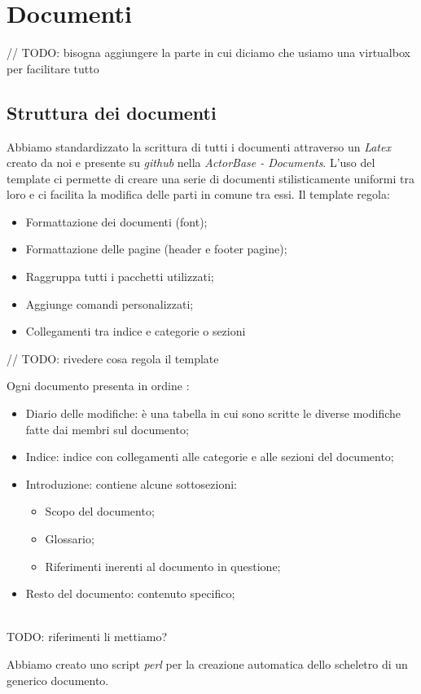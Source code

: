 \section{Documenti}
	// TODO: bisogna aggiungere la parte in cui diciamo che usiamo una virtualbox per facilitare tutto

\subsection{Struttura dei documenti}
Abbiamo standardizzato la scrittura di tutti i documenti attraverso un  \textit{Latex} creato da noi e presente su \textit{github} nella  \textit{ActorBase - Documents}.
L'uso del template ci permette di creare una serie di documenti stilisticamente uniformi tra loro e ci facilita la modifica delle parti in comune tra essi.
Il template regola:
\begin{itemize}
\item Formattazione dei documenti (font);
\item Formattazione delle pagine (header e footer pagine);
\item Raggruppa tutti i pacchetti utilizzati;
\item Aggiunge comandi personalizzati;
\item Collegamenti tra indice e categorie o sezioni
\end{itemize}
	// TODO: rivedere cosa regola il template

Ogni documento presenta in ordine :
\begin{itemize}
\item Diario delle modifiche: è una tabella in cui sono scritte le diverse modifiche fatte dai membri sul documento;
\item Indice: indice con collegamenti alle categorie e alle sezioni del documento;
\item Introduzione: contiene alcune sottosezioni:
	\begin{itemize}
	\item Scopo del documento;
	\item Glossario;
	\item Riferimenti inerenti al documento in questione;
	\end{itemize}
\item Resto del documento: contenuto specifico;
\end{itemize}
	\\TODO: riferimenti li mettiamo?


Abbiamo creato uno script \textit{perl} per la creazione automatica dello scheletro di un generico documento. 

